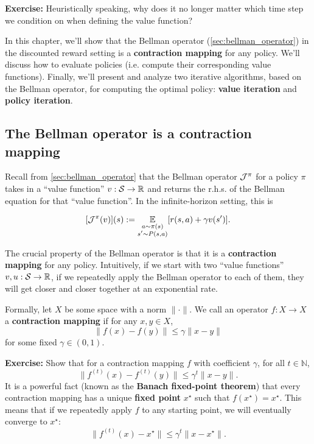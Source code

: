 \documentclass[../main/main]{subfiles}
\begin{document}
\textbf{Exercise:} Heuristically speaking, why does it no longer matter which time step we condition on when defining the value function?

In this chapter, we'll show that the Bellman operator (\ref{sec:bellman_operator}) in the discounted reward setting is a \textbf{contraction mapping} for any policy. We'll discuss how to evaluate policies (i.e. compute their corresponding value functions). Finally, we'll present and analyze two iterative algorithms, based on the Bellman operator, for computing the optimal policy: \textbf{value iteration} and \textbf{policy iteration}.


\subsection{The Bellman operator is a contraction mapping}

Recall from \ref{sec:bellman_operator} that the Bellman operator $\mathcal{J}^{\pi}$ for a policy $\pi$ takes in a ``value function'' $v : \mathcal{S} \to \mathbb{R}$ and returns the r.h.s. of the Bellman equation for that ``value function''. In the infinite-horizon setting, this is

\[
    [\mathcal{J}^{\pi}(v)](s) := \operatorname*{\mathbb{E}}_{\substack{a \sim \pi(s) \\ s' \sim P(s, a)}} [r(s, a) + \gamma v(s')].
\]

The crucial property of the Bellman operator is that it is a \textbf{contraction mapping} for any policy. Intuitively, if we start with two ``value functions'' $v, u : \mathcal{S} \to \mathbb{R}$, if we repeatedly apply the Bellman operator to each of them, they will get closer and closer together at an exponential rate.

Formally, let $X$ be some space with a norm $\|\cdot\|$. We call an operator $f: X \to X$ a \textbf{contraction mapping} if for any $x, y \in X$,
\[
    \|f(x) - f(y)\| \le \gamma \|x - y\|
\]
for some fixed $\gamma \in (0, 1)$.

\textbf{Exercise:} Show that for a contraction mapping $f$ with coefficient $\gamma$, for all $t \in \mathbb{N}$,
\[
    \|f^{(t)}(x) - f^{(t)}(y)\| \le \gamma^t \|x - y\|.
\]
It is a powerful fact (known as the \textbf{Banach fixed-point theorem}) that every contraction mapping has a unique \textbf{fixed point} $x^\star$ such that $f(x^\star) = x^\star$. This means that if we repeatedly apply $f$ to any starting point, we will eventually converge to $x^\star$:
\begin{equation}
    \|f^{(t)}(x) - x^\star\| \le \gamma^t \|x - x^\star\|. \label{eq:contraction_convergence}
\end{equation}
\end{document}
